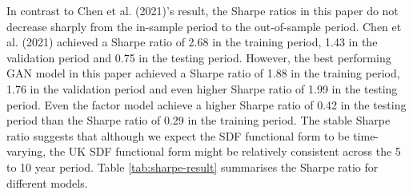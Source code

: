 \documentclass[12pt]{article}
\begin{document}
In contrast to Chen et al. (2021)'s result, the Sharpe ratios
in this paper do not decrease sharply from the in-sample
period to the out-of-sample period.
Chen et al. (2021) achieved a Sharpe ratio of 2.68 in the
training period, 1.43 in the validation period and 0.75 in
the testing period. However, the best performing GAN model in this
paper achieved a Sharpe ratio of 1.88 in the training
period, 1.76 in the validation period and even higher Sharpe
ratio of 1.99 in the testing period. Even the factor model
achieve a higher Sharpe ratio of 0.42 in the testing period than the
Sharpe ratio of 0.29 in the training period.
The stable Sharpe ratio suggests that although we expect the
SDF functional form to be time-varying, the UK SDF
functional form might be relatively consistent across the 5
to 10 year period.
Table \ref{tab:sharpe-result} summarises the Sharpe ratio
for different models.
\end{document}
